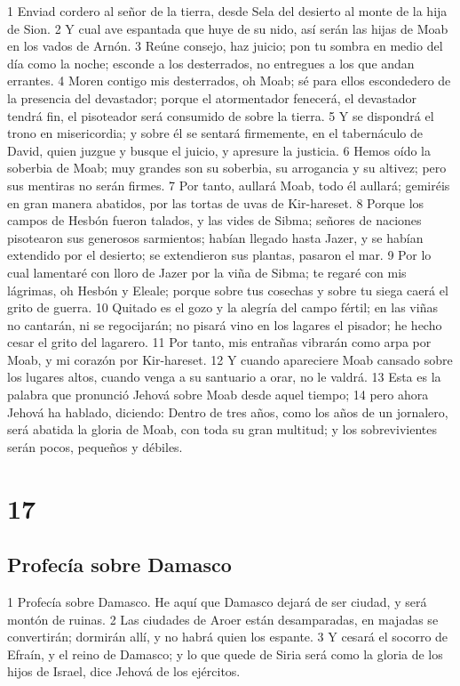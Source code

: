 1 Enviad cordero al señor de la tierra, desde Sela del desierto al monte de la hija de Sion.
2 Y cual ave espantada que huye de su nido, así serán las hijas de Moab en los vados de Arnón.
3 Reúne consejo, haz juicio; pon tu sombra en medio del día como la noche; esconde a los desterrados, no entregues a los que andan errantes.
4 Moren contigo mis desterrados, oh Moab; sé para ellos escondedero de la presencia del devastador; porque el atormentador fenecerá, el devastador tendrá fin, el pisoteador será consumido de sobre la tierra.
5 Y se dispondrá el trono en misericordia; y sobre él se sentará firmemente, en el tabernáculo de David, quien juzgue y busque el juicio, y apresure la justicia.
6 Hemos oído la soberbia de Moab; muy grandes son su soberbia, su arrogancia y su altivez; pero sus mentiras no serán firmes.
7 Por tanto, aullará Moab, todo él aullará; gemiréis en gran manera abatidos, por las tortas de uvas de Kir-hareset.
8 Porque los campos de Hesbón fueron talados, y las vides de Sibma; señores de naciones pisotearon sus generosos sarmientos; habían llegado hasta Jazer, y se habían extendido por el desierto; se extendieron sus plantas, pasaron el mar.
9 Por lo cual lamentaré con lloro de Jazer por la viña de Sibma; te regaré con mis lágrimas, oh Hesbón y Eleale; porque sobre tus cosechas y sobre tu siega caerá el grito de guerra.
10 Quitado es el gozo y la alegría del campo fértil; en las viñas no cantarán, ni se regocijarán; no pisará vino en los lagares el pisador; he hecho cesar el grito del lagarero.
11 Por tanto, mis entrañas vibrarán como arpa por Moab, y mi corazón por Kir-hareset.
12 Y cuando apareciere Moab cansado sobre los lugares altos, cuando venga a su santuario a orar, no le valdrá.
13 Esta es la palabra que pronunció Jehová sobre Moab desde aquel tiempo;
14 pero ahora Jehová ha hablado, diciendo: Dentro de tres años, como los años de un jornalero, será abatida la gloria de Moab, con toda su gran multitud; y los sobrevivientes serán pocos, pequeños y débiles. 

\chapter{17}

\section*{Profecía sobre Damasco}

1 Profecía sobre Damasco. He aquí que Damasco dejará de ser ciudad, y será montón de ruinas.
2 Las ciudades de Aroer están desamparadas, en majadas se convertirán; dormirán allí, y no habrá quien los espante.
3 Y cesará el socorro de Efraín, y el reino de Damasco; y lo que quede de Siria será como la gloria de los hijos de Israel, dice Jehová de los ejércitos.

